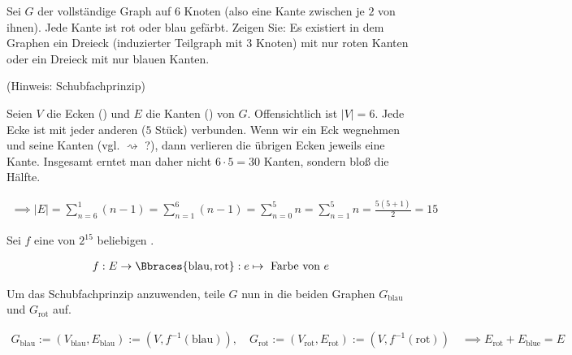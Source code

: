 
\begin{exercise}

Sei $G$ der vollständige Graph auf $6$ Knoten (also eine Kante zwischen je $2$ von ihnen).
Jede Kante ist rot oder blau gefärbt.
Zeigen Sie:
Es existiert in dem Graphen ein Dreieck (induzierter Teilgraph mit $3$ Knoten) mit nur roten Kanten oder ein Dreieck mit nur blauen Kanten.

(Hinweis: Schubfachprinzip)

\end{exercise}


\begin{solution}

\phantom{}


Seien $V$ die Ecken () und $E$ die Kanten () von $G$.
Offensichtlich ist $|V| = 6$.
Jede Ecke ist mit jeder anderen ($5$ Stück) verbunden.
Wenn wir ein Eck wegnehmen und seine Kanten  (vgl.  $\rightsquigarrow$ ?), dann verlieren die übrigen Ecken jeweils eine Kante.
Insgesamt erntet man daher nicht $6 \cdot 5 = 30$ Kanten, sondern bloß die Hälfte.

\begin{align*}
  \implies
  |E|
  =
  \sum_{n=6}^1 (n - 1)
  =
  \sum_{n=1}^6 (n - 1)
  =
  \sum_{n=0}^5 n
  =
  \sum_{n=1}^5 n
  =
  \frac{5 (5 + 1)}{2}
  =
  15
\end{align*}

Sei $f$ eine von $2^{15}$ beliebigen .

\begin{align*}
  f:
  E \to \Bbraces{\text{blau}, \text{rot}}:
  e \mapsto ~\text{Farbe von}~ e
\end{align*}

Um das Schubfachprinzip anzuwenden, teile $G$ nun in die beiden Graphen $G_{\text{blau}}$ und $G_{\text{rot}}$ auf.

\begin{align*}
  G_{\text{blau}} := (V_{\text{blau}}, E_{\text{blau}}) := (V, f^{-1}(\text{blau})),
  \quad
  G_{\text{rot}}  := (V_{\text{rot}}, E_{\text{rot}})   :=(V, f^{-1}(\text{rot}))
  \quad
  \implies
  E_{\text{rot}} + E_{\text{blue}} = E
\end{align*}


\end{solution}
